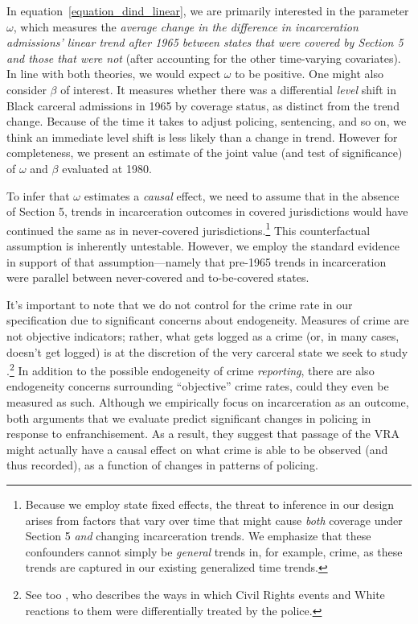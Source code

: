 \documentclass[12pt]{article}
\begin{document}
In equation~\ref{equation_dind_linear}, we are primarily interested in the parameter $\omega$, which measures the \emph{average change in the difference in incarceration admissions' linear trend after 1965 between states that were covered by Section 5 and those that were not} (after accounting for the other time-varying covariates).  In line with both theories, we would expect $\omega$ to be positive.  One might also consider $\beta$ of interest.  It measures whether there was a differential \emph{level} shift in Black carceral admissions in 1965 by coverage status, as distinct from the trend change.  Because of the time it takes to adjust policing, sentencing, and so on, we think an immediate level shift is less likely than a change in trend. However for completeness, we present an estimate of the joint value (and test of significance) of $\omega$ and $\beta$ evaluated at 1980.

To infer that $\omega$ estimates a \emph{causal} effect, we need to assume that in the absence of Section 5, trends in incarceration outcomes in covered jurisdictions would have continued the same as in never-covered jurisdictions.\footnote{Because we employ state fixed effects, the threat to inference in our design arises from factors that vary over time that might cause \emph{both} coverage under Section 5 \emph{and} changing incarceration trends.  We emphasize that these confounders cannot simply be \emph{general} trends in, for example, crime, as these trends are captured in our existing generalized time trends.}  This counterfactual assumption is inherently untestable.  However, we employ the standard evidence in support of that assumption---namely that pre-1965 trends in incarceration were parallel between never-covered and to-be-covered states.

It's important to note that we do not control for the crime rate in our specification due to significant concerns about endogeneity. Measures of crime are not objective indicators; rather, what gets logged as a crime (or, in many cases, doesn't get logged) is at the discretion of the very carceral state we seek to study \citep{Black:1970wu,Muhammad:2011wf}.\footnote{See too \cite{Ward:2015tc}, who describes the ways in which Civil Rights events and White reactions to them were differentially treated by the police.}  In addition to the possible endogeneity of crime \emph{reporting}, there are also endogeneity concerns surrounding ``objective'' crime rates, could they even be measured as such. Although we empirically focus on incarceration as an outcome, both arguments that we evaluate predict significant changes in policing in response to enfranchisement. As a result, they suggest that passage of the VRA might actually have a causal effect on what crime is able to be observed (and thus recorded), as a function of changes in patterns of policing.
\end{document}
